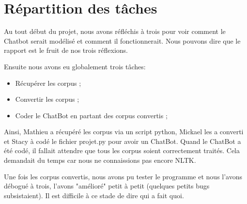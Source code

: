 \section{Répartition des tâches}
	Au tout début du projet, nous avons réfléchis à trois pour voir comment le Chatbot serait modélisé et comment il fonctionnerait. Nous pouvons dire que le rapport est le fruit de nos trois réflexions.

	Ensuite nous avons eu globalement trois tâches:
	\begin{itemize}
		\item Récupérer les corpus ;
		\item Convertir les corpus ;
		\item Coder le ChatBot en partant des corpus convertis ;
	\end{itemize}

	Ainsi, Mathieu a récupéré les corpus via un script python, Mickael les a converti et Stacy à codé le fichier projet.py pour avoir un ChatBot.
	Quand le ChatBot a été codé, il fallait attendre que tous les corpus soient correctement traités. Cela demandait du temps car nous ne connaissions pas encore NLTK.

	Une fois les corpus convertis, nous avons pu tester le programme et nous l'avons débogué à trois, l'avons "amélioré" petit à petit (quelques petits bugs subsistaient). Il est difficile à ce stade de dire qui a fait quoi.
